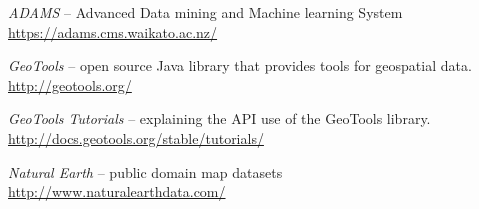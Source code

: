 %

\begin{thebibliography}{999}

		\textit{ADAMS} -- Advanced Data mining and Machine learning System \\
		\url{https://adams.cms.waikato.ac.nz/}{}
		
		\textit{GeoTools} -- open source Java library that provides tools for geospatial data. \\
		\url{http://geotools.org/}{}
		
		\textit{GeoTools Tutorials} -- explaining the API use of the GeoTools library. \\
		\url{http://docs.geotools.org/stable/tutorials/}{}
		
		\textit{Natural Earth} -- public domain map datasets \\
		\url{http://www.naturalearthdata.com/}{}

\end{thebibliography}
